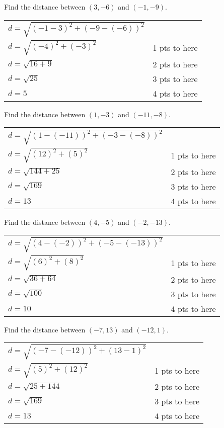 {
	Find the distance between $(3, -6)$ and $(-1,-9)$.
}
{
	\begin{tabular}{l r}
	$d=\sqrt{(-1-3)^2+(-9-(-6))^2}$ & \\
	$d=\sqrt{(-4)^2+(-3)^2}$ & 1 pts to here\\
	$d=\sqrt{16+9}$ & 2 pts to here\\
	$d=\sqrt{25}$ & 3 pts to here\\
	$d=5$ & 4 pts to here
	\end{tabular}
}

{
	Find the distance between $(1, -3)$ and $(-11,-8)$.
}
{
	\begin{tabular}{l r}
	$d=\sqrt{(1-(-11))^2+(-3-(-8))^2}$ & \\
	$d=\sqrt{(12)^2+(5)^2}$ & 1 pts to here\\
	$d=\sqrt{144+25}$ & 2 pts to here\\
	$d=\sqrt{169}$ & 3 pts to here\\
	$d=13$ & 4 pts to here
	\end{tabular}
}

{
	Find the distance between $(4, -5)$ and $(-2,-13)$.
}
{
	\begin{tabular}{l r}
	$d=\sqrt{(4-(-2))^2+(-5-(-13))^2}$ & \\
	$d=\sqrt{(6)^2+(8)^2}$ & 1 pts to here\\
	$d=\sqrt{36+64}$ & 2 pts to here\\
	$d=\sqrt{100}$ & 3 pts to here\\
	$d=10$ & 4 pts to here
	\end{tabular}
}

{
	Find the distance between $(-7, 13)$ and $(-12,1)$.
}
{
	\begin{tabular}{l r}
	$d=\sqrt{(-7-(-12))^2+(13-1)^2}$ & \\
	$d=\sqrt{(5)^2+(12)^2}$ & 1 pts to here\\
	$d=\sqrt{25+144}$ & 2 pts to here\\
	$d=\sqrt{169}$ & 3 pts to here\\
	$d=13$ & 4 pts to here
	\end{tabular}
}
